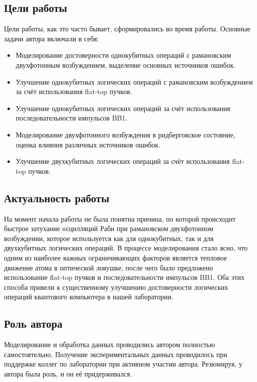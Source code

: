 \subsection{Цели работы}

Цели работы, как это часто бывает, сформировались во время работы. Основные задачи автора включали в себя:

\begin{itemize}
	\item Моделирование достоверности однокубитных операций с рамановским двухфотонным возбуждением, выделение основных источников ошибок.

	\item Улучшение однокубитных логических операций с рамановским возбуждением за счёт использования flat-top пучков. 

	\item Улучшение однокубитных логических операций за счёт использования последовательности импульсов BB1.

	\item Моделирование двухфотонного возбуждения в ридберговское состояние, оценка влияния различных источников ошибок.

	\item Улучшение двухкубитных логических операций за счёт использования flat-top пучков. 
\end{itemize}

\subsection{Актуальность работы}

На момент начала работы не была понятна причина, по которой происходит быстрое затухание осцилляций Раби при рамановском двухфотонном возбуждении, которое используется как для однокубитных, так и для двухкубитных логических операций. В процессе моделирования стало ясно, что одним из наиболее важных ограничивающих факторов является тепловое движение атома в оптической ловушке, после чего было предложено использование flat-top пучков и последовательности импульсов BB1. Оба этих способа привели к существенному улучшению достоверности логических операций квантового компьютера в нашей лаборатории. 

\subsection{Роль автора}

Моделирование и обработка данных проводились автором полностью самостоятельно. Получение экспериментальных данных проводилось при поддержке коллег по лаборатории при активном участии автора. Резюмируя, у автора была роль, и он её придерживался.

